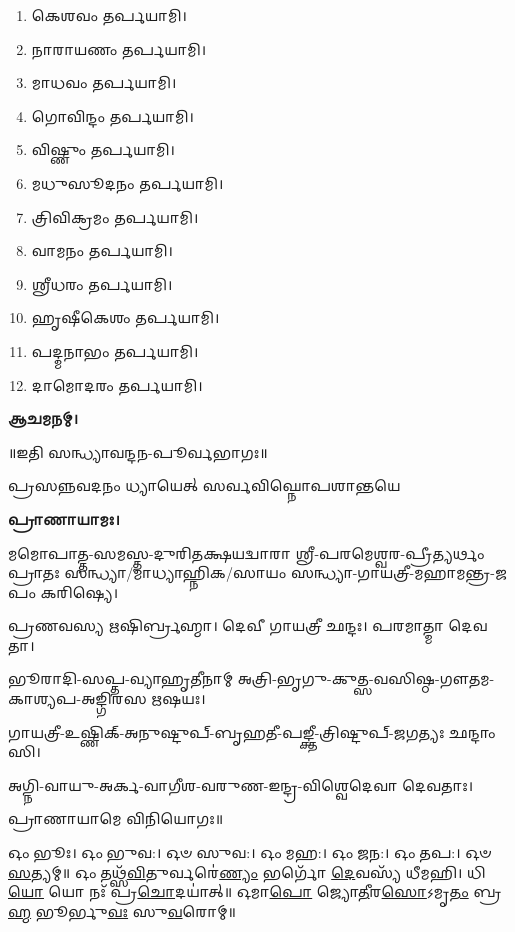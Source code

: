 
\begin{multicols}{2}
\begin{enumerate}
\item 𑌕𑍇𑌶𑌵𑌂 𑌤𑌰𑍍𑌪𑌯𑌾𑌮𑌿।
\item 𑌨𑌾𑌰𑌾𑌯𑌣𑌂 𑌤𑌰𑍍𑌪𑌯𑌾𑌮𑌿।
\item 𑌮𑌾𑌧𑌵𑌂 𑌤𑌰𑍍𑌪𑌯𑌾𑌮𑌿।
\item 𑌗𑍋𑌵𑌿𑌨𑍍𑌦𑌂 𑌤𑌰𑍍𑌪𑌯𑌾𑌮𑌿।
\item 𑌵𑌿𑌷𑍍𑌣𑍁𑌂 𑌤𑌰𑍍𑌪𑌯𑌾𑌮𑌿।
\item 𑌮𑌧𑍁𑌸𑍂𑌦𑌨𑌂 𑌤𑌰𑍍𑌪𑌯𑌾𑌮𑌿।
\item 𑌤𑍍𑌰𑌿𑌵𑌿𑌕𑍍𑌰𑌮𑌂 𑌤𑌰𑍍𑌪𑌯𑌾𑌮𑌿।
\item 𑌵𑌾𑌮𑌨𑌂 𑌤𑌰𑍍𑌪𑌯𑌾𑌮𑌿।
\item 𑌶𑍍𑌰𑍀𑌧𑌰𑌂 𑌤𑌰𑍍𑌪𑌯𑌾𑌮𑌿।
\item 𑌹𑍃𑌷𑍀𑌕𑍇𑌶𑌂 𑌤𑌰𑍍𑌪𑌯𑌾𑌮𑌿।
\item 𑌪𑌦𑍍𑌮𑌨𑌾𑌭𑌂 𑌤𑌰𑍍𑌪𑌯𑌾𑌮𑌿।
\item 𑌦𑌾𑌮𑍋𑌦𑌰𑌂 𑌤𑌰𑍍𑌪𑌯𑌾𑌮𑌿।
\end{enumerate}
\end{multicols}

\textbf{𑌆𑌚𑌮𑌨𑌮𑍍।}


\centerline{॥𑌇𑌤𑌿 𑌸𑌨𑍍𑌧𑍍𑌯𑌾𑌵𑌨𑍍𑌦𑌨-𑌪𑍂𑌰𑍍𑌵𑌭𑌾𑌗𑌃॥}



{𑌪𑍍𑌰𑌸𑌨𑍍𑌨𑌵𑌦𑌨𑌂 𑌧𑍍𑌯𑌾𑌯𑍇𑌤𑍍 𑌸𑌰𑍍𑌵𑌵𑌿𑌘𑍍𑌨𑍋𑌪𑌶𑌾𑌨𑍍𑌤𑌯𑍇}

\textbf{𑌪𑍍𑌰𑌾𑌣𑌾𑌯𑌾𑌮𑌃।}

𑌮𑌮𑍋𑌪𑌾𑌤𑍍𑌤-𑌸𑌮𑌸𑍍𑌤-𑌦𑍁𑌰𑌿𑌤𑌕𑍍𑌷𑌯𑌦𑍍𑌵𑌾𑌰𑌾 𑌶𑍍𑌰𑍀-𑌪𑌰𑌮𑍇𑌶𑍍𑌵𑌰-𑌪𑍍𑌰𑍀𑌤𑍍𑌯𑌰𑍍𑌥𑌂 𑌪𑍍𑌰𑌾𑌤𑌃 𑌸𑌨𑍍𑌧𑍍𑌯𑌾/𑌮𑌾𑌧𑍍𑌯𑌾𑌹𑍍𑌨𑌿𑌕/𑌸𑌾𑌯𑌂 𑌸𑌨𑍍𑌧𑍍𑌯𑌾-𑌗𑌾𑌯𑌤𑍍𑌰𑍀-𑌮𑌹𑌾𑌮𑌨𑍍𑌤𑍍𑌰-𑌜𑌪𑌂 𑌕𑌰𑌿𑌷𑍍𑌯𑍇।


𑌪𑍍𑌰𑌣𑌵𑌸𑍍𑌯 𑌋𑌷𑌿𑌰𑍍𑌬𑍍𑌰𑌹𑍍𑌮𑌾।
𑌦𑍇𑌵𑍀 𑌗𑌾𑌯𑌤𑍍𑌰𑍀 𑌛𑌨𑍍𑌦𑌃।
𑌪𑌰𑌮𑌾𑌤𑍍𑌮𑌾 𑌦𑍇𑌵𑌤𑌾।

𑌭𑍂𑌰𑌾𑌦𑌿-𑌸𑌪𑍍𑌤-𑌵𑍍𑌯𑌾𑌹𑍃𑌤𑍀𑌨𑌾𑌮𑍍 𑌅𑌤𑍍𑌰𑌿-𑌭𑍃𑌗𑍁-𑌕𑍁𑌤𑍍𑌸-𑌵𑌸𑌿𑌷𑍍𑌠-𑌗𑍗𑌤𑌮-𑌕𑌾𑌶𑍍𑌯𑌪-𑌅𑌙𑍍𑌗𑌿𑌰𑌸 𑌋𑌷𑌯𑌃।

𑌗𑌾𑌯𑌤𑍍𑌰𑍀-𑌉𑌷𑍍𑌣𑌿𑌕𑍍-𑌅𑌨𑍁𑌷𑍍𑌟𑍁𑌪𑍍-𑌬𑍃𑌹𑌤𑍀-𑌪𑌙𑍍𑌕𑍍𑌤𑍀-𑌤𑍍𑌰𑌿𑌷𑍍𑌟𑍁𑌪𑍍-𑌜𑌗𑌤𑍍𑌯𑌃 𑌛𑌨𑍍𑌦𑌾𑌂𑌸𑌿।

𑌅𑌗𑍍𑌨𑌿-𑌵𑌾𑌯𑍁-𑌅𑌰𑍍𑌕-𑌵𑌾𑌗𑍀𑌶-𑌵𑌰𑍁𑌣-𑌇𑌨𑍍𑌦𑍍𑌰-𑌵𑌿𑌶𑍍𑌵𑍇𑌦𑍇𑌵𑌾 𑌦𑍇𑌵𑌤𑌾𑌃।
      
𑌪𑍍𑌰𑌾𑌣𑌾𑌯𑌾𑌮𑍇 𑌵𑌿𑌨𑌿𑌯𑍋𑌗𑌃॥


𑌓𑌂 𑌭𑍂𑌃। 𑌓𑌂 𑌭𑍁𑌵:। 𑌓𑍞 𑌸𑍁𑌵:। 𑌓𑌂 𑌮𑌹:। 𑌓𑌂 𑌜𑌨:। 𑌓𑌂 𑌤𑌪:। 𑌓𑍞 \ul{𑌸}\-𑌤𑍍𑌯𑌮𑍍॥
𑌓𑌂 𑌤𑌥𑍍𑌸᳴\-\ul{𑌵𑌿}\-𑌤𑍁𑌰𑍍𑌵𑌰𑍇॑\-\ul{𑌣𑍍𑌯𑌂} 𑌭𑌰𑍍𑌗𑍋᳴ \ul{𑌦𑍇}\-𑌵𑌸𑍍𑌯᳴ 𑌧𑍀𑌮𑌹𑌿। 𑌧𑌿\-\ul{𑌯𑍋} 𑌯𑍋 𑌨𑌃᳴ 𑌪𑍍𑌰\-\ul{𑌚𑍋}\-𑌦𑌯𑌾॑𑌤𑍍॥
𑌓𑌮𑌾\-\ul{𑌪𑍋} 𑌜𑍍𑌯𑍋\-\ul{𑌤𑍀}\-𑌰\-\ul{𑌸𑍋}\-𑌽𑌮𑍃\-\ul{𑌤𑌂} 𑌬𑍍𑌰\-\ul{𑌹𑍍𑌮} 𑌭𑍂𑌰𑍍𑌭𑍁\-\ul{𑌵𑌃} 𑌸𑍁\-\ul{𑌵}\-𑌰𑍋𑌮𑍍॥




